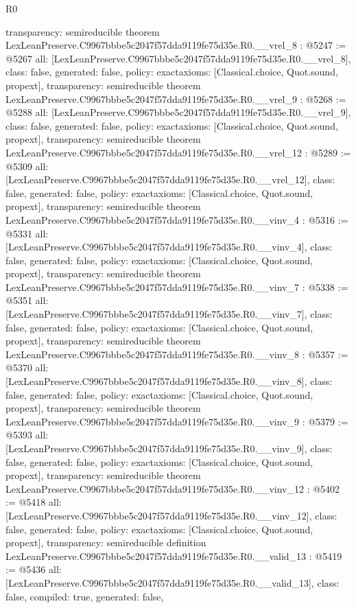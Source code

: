 \begin{lexlean}{R0}
\begin{coremodule}
{  transparency: semireducible
}
theorem LexLeanPreserve.C9967bbbe5c2047f57dda9119fe75d35e.R0.__vrel_8 : @5247 := @5267 {
  all: [LexLeanPreserve.C9967bbbe5c2047f57dda9119fe75d35e.R0.__vrel_8],
  class: false,
  generated: false,
  policy: exact{axioms: [Classical.choice, Quot.sound, propext]},
  transparency: semireducible
}
theorem LexLeanPreserve.C9967bbbe5c2047f57dda9119fe75d35e.R0.__vrel_9 : @5268 := @5288 {
  all: [LexLeanPreserve.C9967bbbe5c2047f57dda9119fe75d35e.R0.__vrel_9],
  class: false,
  generated: false,
  policy: exact{axioms: [Classical.choice, Quot.sound, propext]},
  transparency: semireducible
}
theorem LexLeanPreserve.C9967bbbe5c2047f57dda9119fe75d35e.R0.__vrel_12 : @5289 := @5309 {
  all: [LexLeanPreserve.C9967bbbe5c2047f57dda9119fe75d35e.R0.__vrel_12],
  class: false,
  generated: false,
  policy: exact{axioms: [Classical.choice, Quot.sound, propext]},
  transparency: semireducible
}
theorem LexLeanPreserve.C9967bbbe5c2047f57dda9119fe75d35e.R0.__vinv_4 : @5316 := @5331 {
  all: [LexLeanPreserve.C9967bbbe5c2047f57dda9119fe75d35e.R0.__vinv_4],
  class: false,
  generated: false,
  policy: exact{axioms: [Classical.choice, Quot.sound, propext]},
  transparency: semireducible
}
theorem LexLeanPreserve.C9967bbbe5c2047f57dda9119fe75d35e.R0.__vinv_7 : @5338 := @5351 {
  all: [LexLeanPreserve.C9967bbbe5c2047f57dda9119fe75d35e.R0.__vinv_7],
  class: false,
  generated: false,
  policy: exact{axioms: [Classical.choice, Quot.sound, propext]},
  transparency: semireducible
}
theorem LexLeanPreserve.C9967bbbe5c2047f57dda9119fe75d35e.R0.__vinv_8 : @5357 := @5370 {
  all: [LexLeanPreserve.C9967bbbe5c2047f57dda9119fe75d35e.R0.__vinv_8],
  class: false,
  generated: false,
  policy: exact{axioms: [Classical.choice, Quot.sound, propext]},
  transparency: semireducible
}
theorem LexLeanPreserve.C9967bbbe5c2047f57dda9119fe75d35e.R0.__vinv_9 : @5379 := @5393 {
  all: [LexLeanPreserve.C9967bbbe5c2047f57dda9119fe75d35e.R0.__vinv_9],
  class: false,
  generated: false,
  policy: exact{axioms: [Classical.choice, Quot.sound, propext]},
  transparency: semireducible
}
theorem LexLeanPreserve.C9967bbbe5c2047f57dda9119fe75d35e.R0.__vinv_12 : @5402 := @5418 {
  all: [LexLeanPreserve.C9967bbbe5c2047f57dda9119fe75d35e.R0.__vinv_12],
  class: false,
  generated: false,
  policy: exact{axioms: [Classical.choice, Quot.sound, propext]},
  transparency: semireducible
}
definition LexLeanPreserve.C9967bbbe5c2047f57dda9119fe75d35e.R0.__valid_13 : @5419 := @5436 {
  all: [LexLeanPreserve.C9967bbbe5c2047f57dda9119fe75d35e.R0.__valid_13],
  class: false,
  compiled: true,
  generated: false,
}
\end{coremodule}
\end{lexlean}
